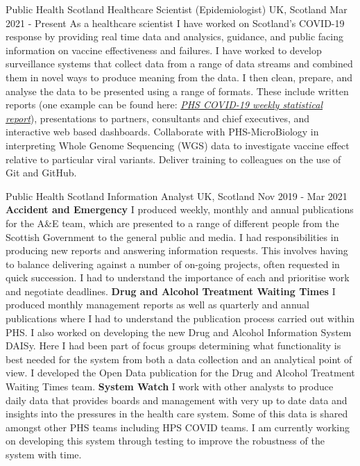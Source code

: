 \documentclass[11pt, a4paper]{awesome-cv}
\begin{document}
\begin{cventries}
 \cventry
{Public Health Scotland} %
{Healthcare Scientist (Epidemiologist)} %
{UK, Scotland} %
{Mar 2021 - Present} %
{
  As a healthcare scientist I have worked on Scotland's COVID-19 response by 
  providing real time data and analysics, guidance, and public facing 
  information on vaccine effectiveness and failures.\newline
  I have worked to develop surveillance systems that collect data from a range 
  of data streams and combined them in novel ways to produce meaning from the 
  data. I then clean, prepare, and analyse the data to be presented using a 
  range of formats. These include written reports (one example can be found 
  here: \href{https://publichealthscotland.scot/publications/covid-19-statistical-report/}{\textit{PHS COVID-19 weekly statistical report}}), 
  presentations to partners, consultants and chief executives, and interactive 
  web based dashboards. Collaborate with PHS-MicroBiology in interpreting Whole
  Genome Sequencing (WGS) data to investigate vaccine effect relative to 
  particular viral variants.\newline
  Deliver training to colleagues on the use of Git and GitHub.
}

\cventry
{Public Health Scotland}
{Information Analyst}
{UK, Scotland}
{Nov 2019 - Mar 2021}
{
            \textbf{Accident and Emergency}\newline
        I produced weekly, monthly and annual publications for the A\&E team, which are presented to a range of different people from the Scottish Government to the general public and media. I had responsibilities in producing new reports and answering information requests. This involves having to balance delivering against a number of on-going projects, often requested in quick succession. I had to understand the importance of each and prioritise work and negotiate deadlines.\newline
        \textbf{Drug and Alcohol Treatment Waiting Times}\newline
        I produced monthly management reports as well as quarterly and annual publications where I had to understand the publication process carried out within PHS. I also worked on developing the new Drug and Alcohol Information System DAISy. Here I had been part of focus groups determining what functionality is best needed for the system from both a data collection and an analytical point of view. I developed the Open Data publication for the Drug and Alcohol Treatment Waiting Times team.\newline
        \textbf{System Watch}\newline
        I work with other analysts to produce daily data that provides boards and management with very up to date data and insights into the pressures in the health care system. Some of this data is shared amongst other PHS teams including HPS COVID teams. I am currently working on developing this system through testing to improve the robustness of the system with time.\newline
}


\end{cventries}
\end{document}
